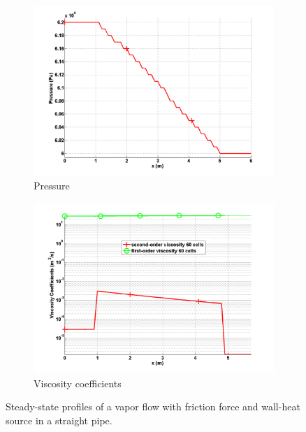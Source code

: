 \begin{figure}[H]
        \begin{subfigure}[b]{0.495\textwidth}
                \centering
                \includegraphics[width=\textwidth]{figures/vapor_friction_heat_pressure_source_terms.png}
                \caption{Pressure}
                \label{fig:1d-vapor-friction-heat-pressure-sct3}
        \end{subfigure}
        \begin{subfigure}[b]{0.495\textwidth}
                \centering
                \includegraphics[width=\textwidth]{figures/vapor_friction_heat_viscosity_source_terms.png}
                \caption{Viscosity coefficients}
                \label{fig:1d-vapor-friction-heat-visc-sct3}
        \end{subfigure}
        \caption{Steady-state profiles of a vapor flow with friction force and wall-heat source in a straight pipe.}
				\label{fig:1d-vapor-friction-heat-sct3}
\end{figure}
